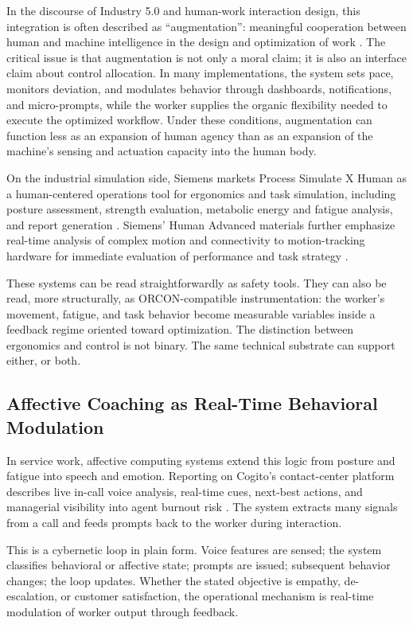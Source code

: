 \documentclass[runningheads]{llncs}
\begin{document}
In the discourse of Industry 5.0 and human-work interaction design, this integration is often described as ``augmentation'': meaningful cooperation between human and machine intelligence in the design and optimization of work \cite{breque2021industry,hwid2026cfp}. The critical issue is that augmentation is not only a moral claim; it is also an interface claim about control allocation. In many implementations, the system sets pace, monitors deviation, and modulates behavior through dashboards, notifications, and micro-prompts, while the worker supplies the organic flexibility needed to execute the optimized workflow. Under these conditions, augmentation can function less as an expansion of human agency than as an expansion of the machine's sensing and actuation capacity into the human body.

On the industrial simulation side, Siemens markets Process Simulate X Human as a human-centered operations tool for ergonomics and task simulation, including posture assessment, strength evaluation, metabolic energy and fatigue analysis, and report generation \cite{siemensPSXHuman}. Siemens' Human Advanced materials further emphasize real-time analysis of complex motion and connectivity to motion-tracking hardware for immediate evaluation of performance and task strategy \cite{siemensHumanAdvanced}.

These systems can be read straightforwardly as safety tools. They can also be read, more structurally, as ORCON-compatible instrumentation: the worker's movement, fatigue, and task behavior become measurable variables inside a feedback regime oriented toward optimization. The distinction between ergonomics and control is not binary. The same technical substrate can support either, or both.

\subsection{Affective Coaching as Real-Time Behavioral Modulation}

In service work, affective computing systems extend this logic from posture and fatigue into speech and emotion. Reporting on Cogito's contact-center platform describes live in-call voice analysis, real-time cues, next-best actions, and managerial visibility into agent burnout risk \cite{cxtoday2022cogito}. The system extracts many signals from a call and feeds prompts back to the worker during interaction.

This is a cybernetic loop in plain form. Voice features are sensed; the system classifies behavioral or affective state; prompts are issued; subsequent behavior changes; the loop updates. Whether the stated objective is empathy, de-escalation, or customer satisfaction, the operational mechanism is real-time modulation of worker output through feedback.
\end{document}
